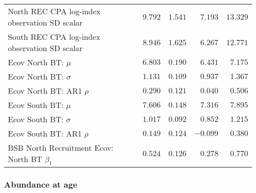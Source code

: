 \documentclass[
]{article}
\begin{document}
\begin{landscape}
\begin{longtable}[t]{lrrrr}
North REC CPA log-index observation SD scalar & $9.792$ & $1.541$ & $7.193$ & $13.329$\\
South REC CPA log-index observation SD scalar & $8.946$ & $1.625$ & $6.267$ & $12.771$\\
Ecov North BT: $\mu$ & $6.803$ & $0.190$ & $6.431$ & $7.175$\\
\addlinespace
Ecov North BT: $\sigma$ & $1.131$ & $0.109$ & $0.937$ & $1.367$\\
Ecov North BT: AR1 $\rho$ & $0.290$ & $0.121$ & $0.040$ & $0.506$\\
Ecov South BT: $\mu$ & $7.606$ & $0.148$ & $7.316$ & $7.895$\\
Ecov South BT: $\sigma$ & $1.017$ & $0.092$ & $0.852$ & $1.215$\\
Ecov South BT: AR1 $\rho$ & $0.149$ & $0.124$ & $-0.099$ & $0.380$\\
\addlinespace
BSB North Recruitment Ecov: North BT $\beta_1$ & $0.524$ & $0.126$ & $0.278$ & $0.770$\\*
\end{longtable}
\end{landscape}

\hypertarget{abundance-at-age}{%
\subsubsection{Abundance at age}\label{abundance-at-age}}
\end{document}
